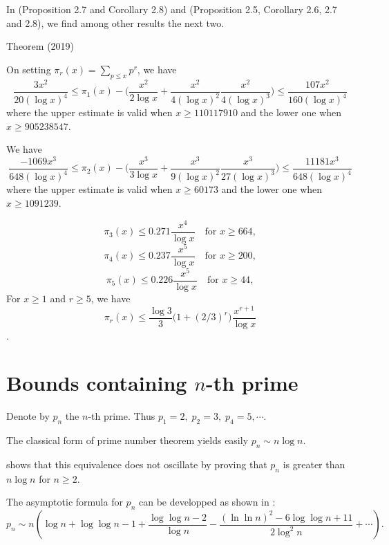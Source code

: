  
In
\cite{Deleglise-Nicolas*19a}
(Proposition 2.7 and Corollary 2.8) and
\cite{Deleglise-Nicolas*19b}
(Proposition 2.5, Corollary 2.6, 2.7 and 2.8),
we find among other results the next two.
\par 
\begin{thm}{Theorem (2019)}

  On setting $\pi_r(x)=\sum_{p\le x}p^r$, we have
  $$
  \frac{3x^2}{20(\log x)^4}
  \le \pi_1(x)-\biggl(
  \frac{x^2}{2\log x}
  +\frac{x^2}{4(\log x)^2}
  \frac{x^2}{4(\log x)^3}
  \biggr)
  \le
  \frac{107x^2}{160(\log x)^4}
  $$
  where the upper estimate is valid when $x\ge 110117910$
  and the lower one when $x\ge905238547$.
  \par 
    We have
    $$
  \frac{-1069x^3}{648(\log x)^4}
  \le \pi_2(x)-\biggl(
  \frac{x^3}{3\log x}
  +\frac{x^3}{9(\log x)^2}
  \frac{x^3}{27(\log x)^3}
  \biggr)
  \le
  \frac{11181x^3}{648(\log x)^4}
    $$
    where the upper estimate is valid when $x\ge 60173$
    and the lower one when $x\ge 1091239$.
    \par 
      $$      \pi_3(x)\le 0.271\frac{x^4}{\log x}\quad\text{for $x\ge 664$},$$
      $$      \pi_4(x)\le 0.237\frac{x^5}{\log x}\quad\text{for $x\ge 200$},$$
      $$      \pi_5(x)\le 0.226\frac{x^5}{\log x}\quad\text{for $x\ge 44$},$$
      For $x\ge 1$ and $r\ge5$, we have
      $$ \pi_r(x)\le \frac{\log 3}{3}\bigl(1+(2/3)^r\bigr)
      \frac{x^{r+1}}{\log x}$$.
\end{thm}





  

\section{Bounds containing $n$-th prime}



Denote by $p_n$  the $n$-th prime. Thus $p_1=2,\;p_2=3,\; p_4=5,\cdots$.

The classical form of prime number theorem yields easily
$p_n \sim n \log n.$ 

\cite{Rosser*38}
shows that this equivalence does not oscillate
by proving that $p_n$ is greater than $n\log n$ for $n\geq 2$.  


The asymptotic formula for $p_n$ can be developped as shown in
\cite{Cipolla*02}:
$$
p_n\sim n\left(\log n+\log\log n -1+\frac{\log\log n-2}{\log n}
-\frac{(\ln\ln n)^2-6\log\log n +11}{2\log^2 n}+\cdots\right).
$$

